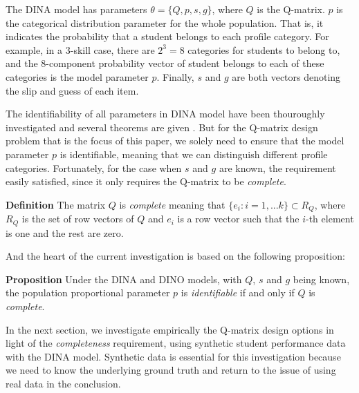 \documentclass{edm_template}
\newcommand{\Michel}[1]{{\textcolor{red}{[#1]}}}
\begin{document}
The DINA model has parameters $\theta = \{Q, p, s, g\}$, where $Q$ is the Q-matrix. $p$ is the categorical distribution parameter for the whole population. That is, it indicates the probability that a student belongs to each profile category. For example, in a 3-skill case, there are $2^3=8$ categories for students to belong to, and the 8-component probability vector of student belongs to each of these categories is the model parameter $p$. Finally, $s$ and $g$ are both vectors denoting the slip and guess of each item. 

The identifiability of all parameters in DINA model have been thouroughly investigated and several theorems are given \cite{xu2015identifiability}. But for the Q-matrix design problem that is the focus of this paper, we solely need to ensure that the model parameter $p$ is identifiable, meaning that we can distinguish different profile categories. Fortunately, for the case when $s$ and $g$ are known, the requirement easily satisfied, since it only requires the Q-matrix to be \textit{complete}.

\textbf{Definition} \cite{xu2015identifiability}  The matrix $Q$ is \textit{complete} meaning that $\{e_{i}:i=1,...k\} \subset R_{Q}$, where $R_{Q}$ is the set of row vectors of $Q$ and $e_{i}$ is a row vector such that the $i$-th element is one and the rest are zero.

And the heart of the current investigation is based on the following proposition:

\textbf{Proposition} \cite{xu2015identifiability} Under the DINA and DINO models, with $Q$, $s$ and $g$ being known, the population proportional parameter $p$ is \textit{identifiable} if and only if $Q$ is \textit{complete}.

   
%

In the next section, we investigate empirically the Q-matrix design options in light of the \textit{completeness} requirement, using synthetic student performance data with the DINA model.  Synthetic data is essential for this investigation because we need to know the underlying ground truth and return to the issue of using real data in the conclusion.
\end{document}
